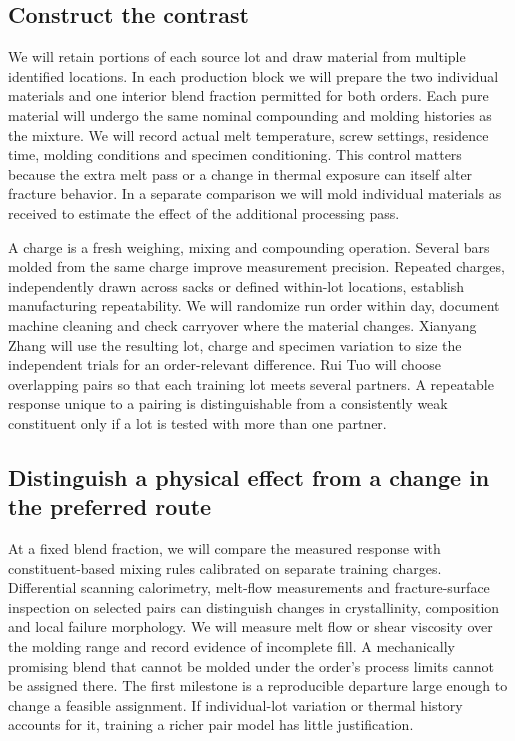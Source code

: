 \documentclass[11pt,letterpaper]{article}
\begin{document}
\subsection*{Construct the contrast}

We will retain portions of each source lot and draw material from multiple identified locations. In each production block we will prepare the two individual materials and one interior blend fraction permitted for both orders. Each pure material will undergo the same nominal compounding and molding histories as the mixture. We will record actual melt temperature, screw settings, residence time, molding conditions and specimen conditioning. This control matters because the extra melt pass or a change in thermal exposure can itself alter fracture behavior. In a separate comparison we will mold individual materials as received to estimate the effect of the additional processing pass.

A charge is a fresh weighing, mixing and compounding operation. Several bars molded from the same charge improve measurement precision. Repeated charges, independently drawn across sacks or defined within-lot locations, establish manufacturing repeatability. We will randomize run order within day, document machine cleaning and check carryover where the material changes. Xianyang Zhang will use the resulting lot, charge and specimen variation to size the independent trials for an order-relevant difference. Rui Tuo will choose overlapping pairs so that each training lot meets several partners. A repeatable response unique to a pairing is distinguishable from a consistently weak constituent only if a lot is tested with more than one partner.

\subsection*{Distinguish a physical effect from a change in the preferred route}

At a fixed blend fraction, we will compare the measured response with constituent-based mixing rules calibrated on separate training charges. Differential scanning calorimetry, melt-flow measurements and fracture-surface inspection on selected pairs can distinguish changes in crystallinity, composition and local failure morphology. We will measure melt flow or shear viscosity over the molding range and record evidence of incomplete fill. A mechanically promising blend that cannot be molded under the order's process limits cannot be assigned there. The first milestone is a reproducible departure large enough to change a feasible assignment. If individual-lot variation or thermal history accounts for it, training a richer pair model has little justification.
\end{document}
